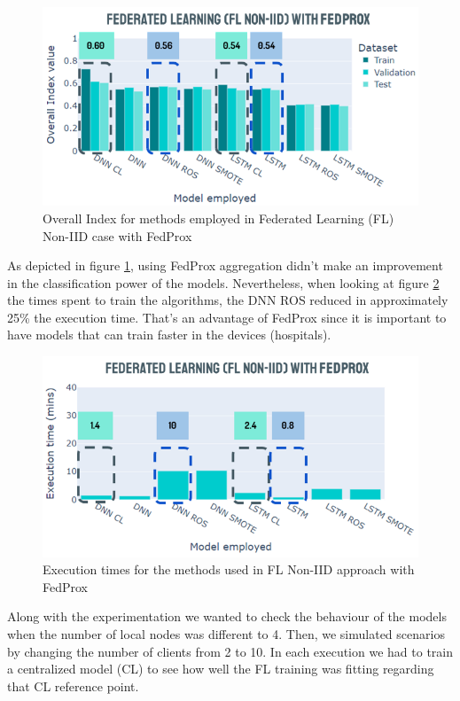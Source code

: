 \begin{figure}[H]
\centering
\includegraphics[scale=0.6]{img/fl_noniid_methods_fedprox.png}
\caption{Overall Index for methods employed in Federated Learning (FL) Non-IID case with FedProx}
\label{fig:fl_noniid_methods_fedprox}
\end{figure}

As depicted in figure \ref{fig:fl_noniid_methods_fedprox}, using FedProx aggregation didn't make an improvement in the classification power of the models. Nevertheless, when looking at figure \ref{fig:times_fl_noniid_fedprox} the times spent to train the algorithms, the DNN ROS reduced in approximately 25\% the execution time.  That's an advantage of FedProx since it is important to have models that can train faster in the devices (hospitals).

\begin{figure}[H]
\centering
\includegraphics[scale=0.6]{img/times_fl_noniid_fedprox.png}
\caption{Execution times for the methods used in FL Non-IID approach with FedProx}
\label{fig:times_fl_noniid_fedprox}
\end{figure}

Along with the experimentation we wanted to check the behaviour of the models when the number of local nodes was different to 4. Then, we simulated scenarios by changing the number of clients from 2 to 10. In each execution we had to train a centralized model (CL) to see how well the FL training was fitting regarding that CL reference point.

